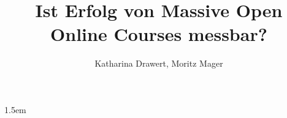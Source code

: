 \documentclass[man,floatsintext,donotrepeattitle,a4paper]{apa6}
\author{Katharina Drawert, Moritz Mager}
\affiliation{Leuphana Universität Lüneburg}
\title{Ist Erfolg von Massive Open Online Courses messbar?}
\makeatletter
\def\flushboth{%
      \let\\\@normalcr
        \@rightskip\z@skip \rightskip\@rightskip
          \leftskip\z@skip
            \parindent 1.5em\relax}
\makeatother
\begin{document}
\maketitle
\flushboth






\printbibliography
\end{document}
